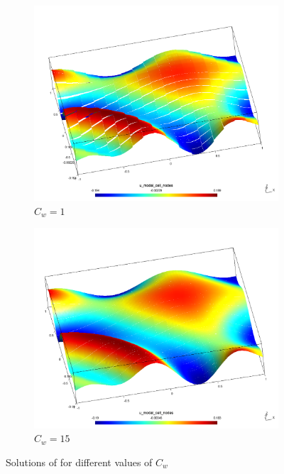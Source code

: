 \begin{figure}[h!]
	\centering
	\begin{subfigure}{.5\textwidth}	
		\centering	
		\includegraphics[width=\linewidth]{../figs/err-sols/0_1_0_0_0_0_0_0_0_sol-h256o02.0.png}
		\caption{$C_w = 1$}
	\end{subfigure}%
	\begin{subfigure}{.5\textwidth}
		\centering	
		\includegraphics[width=\linewidth]{../figs/err-sols/2_1_2_0_0_0_0_0_0_sol-h256o02.0.png}
		\caption{$C_w = 15$}
	\end{subfigure}
	\caption{Solutions of  for different values of $C_w$}
\end{figure}

